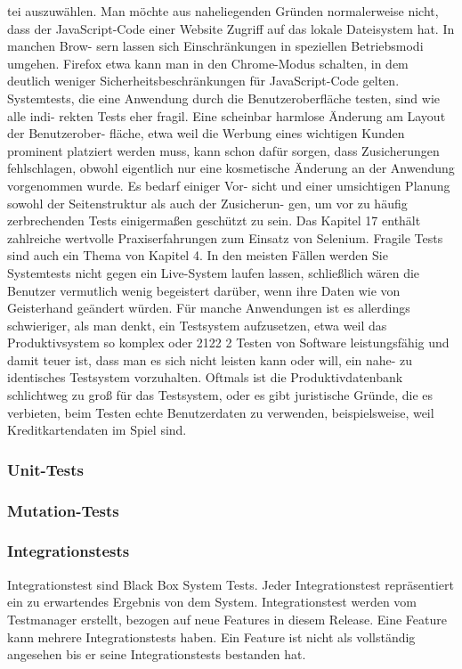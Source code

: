 tei auszuwählen. Man möchte aus naheliegenden Gründen normalerweise nicht, dass der
JavaScript-Code einer Website Zugriff auf das lokale Dateisystem hat. In manchen Brow-
sern lassen sich Einschränkungen in speziellen Betriebsmodi umgehen. Firefox etwa kann
man in den Chrome-Modus schalten, in dem deutlich weniger Sicherheitsbeschränkungen
für JavaScript-Code gelten.
Systemtests, die eine Anwendung durch die Benutzeroberfläche testen, sind wie alle indi-
rekten Tests eher fragil. Eine scheinbar harmlose Änderung am Layout der Benutzerober-
fläche, etwa weil die Werbung eines wichtigen Kunden prominent platziert werden muss,
kann schon dafür sorgen, dass Zusicherungen fehlschlagen, obwohl eigentlich nur eine
kosmetische Änderung an der Anwendung vorgenommen wurde. Es bedarf einiger Vor-
sicht und einer umsichtigen Planung sowohl der Seitenstruktur als auch der Zusicherun-
gen, um vor zu häufig zerbrechenden Tests einigermaßen geschützt zu sein. Das Kapitel 17
enthält zahlreiche wertvolle Praxiserfahrungen zum Einsatz von Selenium. Fragile Tests
sind auch ein Thema von Kapitel 4.
In den meisten Fällen werden Sie Systemtests nicht gegen ein Live-System laufen lassen,
schließlich wären die Benutzer vermutlich wenig begeistert darüber, wenn ihre Daten wie
von Geisterhand geändert würden. Für manche Anwendungen ist es allerdings schwieriger,
als man denkt, ein Testsystem aufzusetzen, etwa weil das Produktivsystem so komplex oder
2122
2 Testen von Software
leistungsfähig und damit teuer ist, dass man es sich nicht leisten kann oder will, ein nahe-
zu identisches Testsystem vorzuhalten. Oftmals ist die Produktivdatenbank schlichtweg zu
groß für das Testsystem, oder es gibt juristische Gründe, die es verbieten, beim Testen echte
Benutzerdaten zu verwenden, beispielsweise, weil Kreditkartendaten im Spiel sind.


\subsubsection{Unit-Tests}

\subsubsection{Mutation-Tests}

\subsubsection{Integrationstests}
Integrationstest sind Black Box System Tests. Jeder Integrationstest repräsentiert ein zu erwartendes
Ergebnis von dem System. Integrationstest werden vom Testmanager erstellt, bezogen auf neue
Features in diesem Release. Eine Feature kann mehrere Integrationstests haben. Ein Feature ist nicht
als vollständig angesehen bis er seine Integrationstests bestanden hat. 

